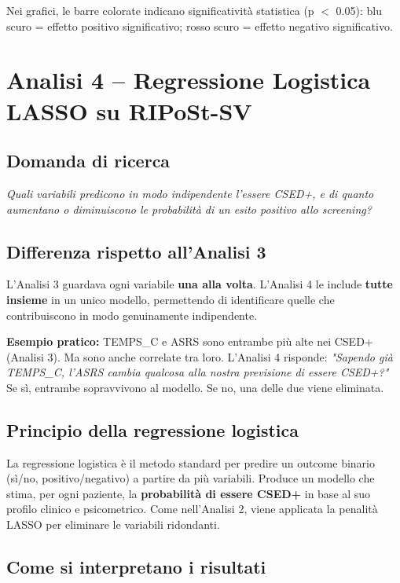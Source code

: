 \documentclass[12pt, a4paper]{article}
\begin{document}
Nei grafici, le barre colorate indicano significatività statistica (p $<$ 0.05):
blu scuro = effetto positivo significativo; rosso scuro = effetto negativo significativo.

\section{Analisi 4 -- Regressione Logistica LASSO su RIPoSt-SV}

\subsection{Domanda di ricerca}

\textit{Quali variabili predicono in modo indipendente l'essere CSED+, e di quanto aumentano
o diminuiscono le probabilità di un esito positivo allo screening?}

\subsection{Differenza rispetto all'Analisi 3}

L'Analisi 3 guardava ogni variabile \textbf{una alla volta}. L'Analisi 4 le include
\textbf{tutte insieme} in un unico modello, permettendo di identificare quelle che contribuiscono
in modo genuinamente indipendente.

\textbf{Esempio pratico:} TEMPS\_C e ASRS sono entrambe più alte nei CSED+ (Analisi 3).
Ma sono anche correlate tra loro. L'Analisi 4 risponde: \textit{"Sapendo già TEMPS\_C,
l'ASRS cambia qualcosa alla nostra previsione di essere CSED+?"} Se sì, entrambe sopravvivono
al modello. Se no, una delle due viene eliminata.

\subsection{Principio della regressione logistica}

La regressione logistica è il metodo standard per predire un outcome binario (sì/no,
positivo/negativo) a partire da più variabili. Produce un modello che stima, per ogni
paziente, la \textbf{probabilità di essere CSED+} in base al suo profilo clinico e
psicometrico. Come nell'Analisi 2, viene applicata la penalità LASSO per eliminare le
variabili ridondanti.

\subsection{Come si interpretano i risultati}
\end{document}
